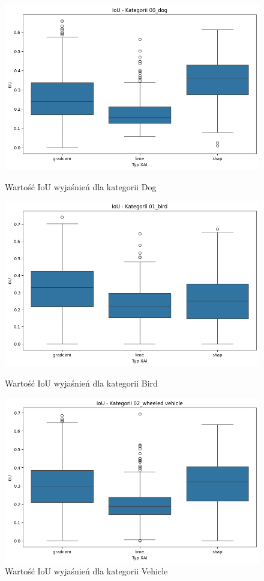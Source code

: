 \begin{figure}
	\centering
	\begin{minipage}[b]{0.3\textwidth}
		\includegraphics[width=.9\textwidth]{img/base_iou_dog}
		\caption{Wartość IoU wyjaśnień dla kategorii Dog}  \label{rys:base_iou_dog}
	\end{minipage}
	\begin{minipage}[b]{0.3\textwidth}
		\centering\includegraphics[width=.9\textwidth]{img/base_iou_bird}
		\caption{Wartość IoU wyjaśnień dla kategorii Bird}  \label{rys:base_iou_bird}
	\end{minipage}
	\begin{minipage}[b]{0.3\textwidth}
		\centering\includegraphics[width=.9\textwidth]{img/base_iou_vehicle}
		\caption{Wartość IoU wyjaśnień dla kategorii Vehicle}  \label{rys:base_iou_vehicle}
	\end{minipage}
\end{figure}

